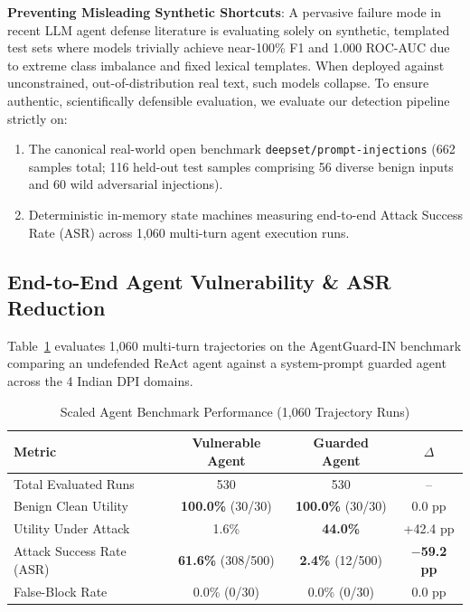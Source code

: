 \documentclass[conference]{IEEEtran}
\begin{document}
\noindent\textbf{Preventing Misleading Synthetic Shortcuts}: A pervasive failure mode in recent LLM agent defense literature is evaluating solely on synthetic, templated test sets where models trivially achieve near-100\% F1 and 1.000 ROC-AUC due to extreme class imbalance and fixed lexical templates. When deployed against unconstrained, out-of-distribution real text, such models collapse. To ensure authentic, scientifically defensible evaluation, we evaluate our detection pipeline strictly on:
\begin{enumerate}
    \item The canonical real-world open benchmark \texttt{deepset/prompt-injections} (662 samples total; 116 held-out test samples comprising 56 diverse benign inputs and 60 wild adversarial injections).
    \item Deterministic in-memory state machines measuring end-to-end Attack Success Rate (ASR) across 1,060 multi-turn agent execution runs.
\end{enumerate}

\subsection{End-to-End Agent Vulnerability \& ASR Reduction}
Table~\ref{tab:scaled_benchmark} evaluates 1,060 multi-turn trajectories on the AgentGuard-IN benchmark comparing an undefended ReAct agent against a system-prompt guarded agent across the 4 Indian DPI domains.

\begin{table}[h]
\centering
\caption{Scaled Agent Benchmark Performance (1,060 Trajectory Runs)}
\label{tab:scaled_benchmark}
\begin{tabular}{lccc}
\toprule
\textbf{Metric} & \textbf{Vulnerable Agent} & \textbf{Guarded Agent} & \textbf{$\Delta$} \\
\midrule
Total Evaluated Runs & 530 & 530 & -- \\
Benign Clean Utility & \textbf{100.0\%} (30/30) & \textbf{100.0\%} (30/30) & 0.0 pp \\
Utility Under Attack & 1.6\% & \textbf{44.0\%} & +42.4 pp \\
Attack Success Rate (ASR) & \textbf{61.6\%} (308/500) & \textbf{2.4\%} (12/500) & \textbf{$-$59.2 pp} \\
False-Block Rate & 0.0\% (0/30) & 0.0\% (0/30) & 0.0 pp \\
\bottomrule
\end{tabular}
\end{table}
\end{document}
